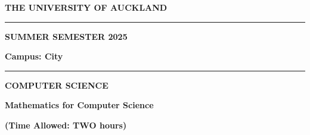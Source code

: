 \documentclass[addpoints,12pt]{exam}
\begin{document}
	\begin{center}
		\vspace*{1cm}
		
		\textbf{\fontsize{20}{8}\selectfont THE UNIVERSITY OF AUCKLAND}
		
		\vspace{0.4cm}
		
		\noindent\rule{0.6\linewidth}{0.4pt}
		
		\vspace{0.5cm}
		
		\textbf{\fontsize{12}{8}\selectfont  SUMMER SEMESTER 2025}
		
		\vspace{0.2cm}
		
		\textbf{\fontsize{12}{8}\selectfont  Campus: City}
		
		\noindent\rule{0.6\linewidth}{0.4pt}
				
		\vspace{0.8cm}
		
		\textbf{\fontsize{12}{8}\selectfont COMPUTER SCIENCE}
		
		\vspace{0.8cm}
		
		\textbf{\fontsize{12}{8}\selectfont  Mathematics for Computer Science}
		
		\vspace{0.8cm}
		
		\textbf{\fontsize{12}{8}\selectfont  (Time Allowed: TWO hours) }
	\end{center}
	
	\vspace{0.8cm}
	
\end{document}

